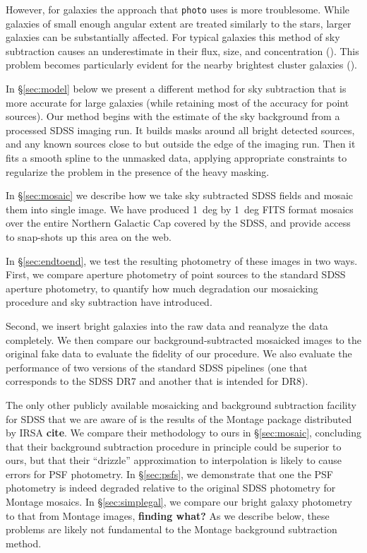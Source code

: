 \documentclass[10pt,preprint]{aastex}
\begin{document}
However, for galaxies the approach that {\tt photo} uses is more
troublesome.  While galaxies of small enough angular extent are
treated similarly to the stars, larger galaxies can be substantially
affected. For typical galaxies this method of sky subtraction causes
an underestimate in their flux, size, and concentration
(\citealt{blanton05b}). This problem becomes particularly evident for the
nearby brightest cluster galaxies (\citealt{bernardi07a,
lauer07a}).

In \S\ref{sec:model} below we present a different method for sky
subtraction that is more accurate for large galaxies (while retaining
most of the accuracy for point sources). Our method begins with the
estimate of the sky background from a processed SDSS imaging run.  It
builds masks around all bright detected sources, and any known sources
close to but outside the edge of the imaging run. Then it fits a
smooth spline to the unmasked data, applying appropriate constraints
to regularize the problem in the presence of the heavy masking.

In \S\ref{sec:mosaic} we describe how we take sky subtracted SDSS
fields and mosaic them into single image. We have produced 1~deg by
1~deg FITS format mosaics over the entire Northern Galactic Cap
covered by the SDSS, and provide access to snap-shots up this area on
the web.

In \S\ref{sec:endtoend}, we test the resulting photometry of these images
in two ways.  First, we compare aperture photometry of point sources
to the standard SDSS aperture photometry, to quantify how much
degradation our mosaicking procedure and sky subtraction have
introduced.

Second, we insert bright galaxies into the raw data and reanalyze the
data completely.  We then compare our background-subtracted mosaicked
images to the original fake data to evaluate the fidelity of our
procedure. We also evaluate the performance of two versions of the
standard SDSS pipelines (one that corresponds to the SDSS DR7 and
another that is intended for DR8).

The only other publicly available mosaicking and background
subtraction facility for SDSS that we are aware of is the results of
the Montage package distributed by IRSA {\bf cite}. We compare their
methodology to ours in \S\ref{sec:mosaic}, concluding that their
background subtraction procedure in principle could be superior to
ours, but that their ``drizzle'' approximation to interpolation is
likely to cause errors for PSF photometry. In \S\ref{sec:psfs}, we
demonstrate that one the PSF photometry is indeed degraded relative to
the original SDSS photometry for Montage mosaics. In
\S\ref{sec:simplegal}, we compare our bright galaxy photometry to that
from Montage images, {\bf finding what?}  As we describe below, these
problems are likely not fundamental to the Montage background
subtraction method.
\end{document}
